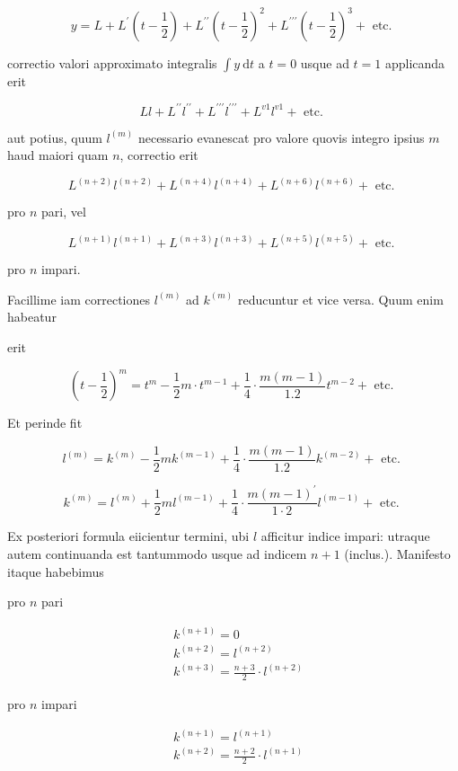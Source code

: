 \documentclass[10pt]{article}
\begin{document}
\[
y=L+L^{\prime}\left(t-\frac{1}{2}\right)+L^{\prime \prime}\left(t-\frac{1}{2}\right)^{2}+L^{\prime \prime \prime}\left(t-\frac{1}{2}\right)^{3}+\text { etc. }
\]

correctio valori approximato integralis \(\int y \mathrm{~d} t\) a \(t=0\) usque ad \(t=1\) applicanda erit

\[
L l+L^{\prime \prime} l^{\prime \prime}+L^{\prime \prime \prime} l^{\prime \prime \prime}+L^{v 1} l^{v 1}+\text { etc. }
\]

aut potius, quum \(l^{(m)}\) necessario evanescat pro valore quovis integro ipsius \(m\) haud maiori quam \(n\), correctio erit

\[
L^{(n+2)} l^{(n+2)}+L^{(n+4)} l^{(n+4)}+L^{(n+6)} l^{(n+6)}+\text { etc. }
\]

pro \(n\) pari, vel

\[
L^{(n+1)} l^{(n+1)}+L^{(n+3)} l^{(n+3)}+L^{(n+5)} l^{(n+5)}+\text { etc. }
\]

pro \(n\) impari.

Facillime iam correctiones \(l^{(m)}\) ad \(k^{(m)}\) reducuntur et vice versa. Quum enim habeatur

erit

\[
\left(t-\frac{1}{2}\right)^{m}=t^{m}-\frac{1}{2} m \cdot t^{m-1}+\frac{1}{4} \cdot \frac{m(m-1)}{1.2} t^{m-2}+\text { etc. }
\]

Et perinde fit

\[
l^{(m)}=k^{(m)}-\frac{1}{2} m k^{(m-1)}+\frac{1}{4} \cdot \frac{m(m-1)}{1.2} k^{(m-2)}+\text { etc. }
\]

\[
k^{(m)}=l^{(m)}+\frac{1}{2} m l^{(m-1)}+\frac{1}{4} \cdot \frac{m(m-1)^{\prime}}{1 \cdot 2} l^{(m-1)}+\text { etc. }
\]

Ex posteriori formula eiicientur termini, ubi \(l\) afficitur indice impari: utraque autem continuanda est tantummodo usque ad indicem \(n+1\) (inclus.). Manifesto itaque habebimus

pro \(n\) pari

\[
\begin{aligned}
& k^{(n+1)}=0 \\
& k^{(n+2)}=l^{(n+2)} \\
& k^{(n+3)}=\frac{n+3}{2} \cdot l^{(n+2)}
\end{aligned}
\]

pro \(n\) impari

\[
\begin{aligned}
& k^{(n+1)}=l^{(n+1)} \\
& k^{(n+2)}=\frac{n+2}{2} \cdot l^{(n+1)}
\end{aligned}
\]
\end{document}
